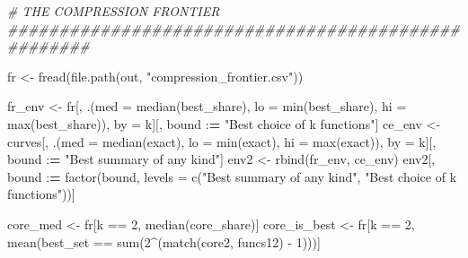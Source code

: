 \documentclass[
  11pt,
]{article}
\newenvironment{Shaded}{\begin{snugshade}}{\end{snugshade}}
\newcommand{\AttributeTok}[1]{\textcolor[rgb]{0.77,0.63,0.00}{#1}}
\newcommand{\CommentTok}[1]{\textcolor[rgb]{0.56,0.35,0.01}{\textit{#1}}}
\newcommand{\DecValTok}[1]{\textcolor[rgb]{0.00,0.00,0.81}{#1}}
\newcommand{\ErrorTok}[1]{\textcolor[rgb]{0.64,0.00,0.00}{\textbf{#1}}}
\newcommand{\FunctionTok}[1]{\textcolor[rgb]{0.00,0.00,0.00}{#1}}
\newcommand{\NormalTok}[1]{#1}
\newcommand{\OtherTok}[1]{\textcolor[rgb]{0.56,0.35,0.01}{#1}}
\newcommand{\SpecialCharTok}[1]{\textcolor[rgb]{0.00,0.00,0.00}{#1}}
\newcommand{\StringTok}[1]{\textcolor[rgb]{0.31,0.60,0.02}{#1}}
\begin{document}
\begin{Shaded}
\begin{Highlighting}[]
\CommentTok{\# THE COMPRESSION FRONTIER \#\#\#\#\#\#\#\#\#\#\#\#\#\#\#\#\#\#\#\#\#\#\#\#\#\#\#\#\#\#\#\#\#\#\#\#\#\#\#\#\#\#\#\#\#\#\#\#\#\#\#\#}

\NormalTok{fr }\OtherTok{\textless{}{-}} \FunctionTok{fread}\NormalTok{(}\FunctionTok{file.path}\NormalTok{(out, }\StringTok{"compression\_frontier.csv"}\NormalTok{))}

\NormalTok{fr\_env }\OtherTok{\textless{}{-}}\NormalTok{ fr[, .(}\AttributeTok{med =} \FunctionTok{median}\NormalTok{(best\_share), }\AttributeTok{lo =} \FunctionTok{min}\NormalTok{(best\_share),}
                 \AttributeTok{hi =} \FunctionTok{max}\NormalTok{(best\_share)), by }\OtherTok{=}\NormalTok{ k][, bound }\SpecialCharTok{:}\ErrorTok{=} \StringTok{"Best choice of k functions"}\NormalTok{]}
\NormalTok{ce\_env }\OtherTok{\textless{}{-}}\NormalTok{ curves[, .(}\AttributeTok{med =} \FunctionTok{median}\NormalTok{(exact), }\AttributeTok{lo =} \FunctionTok{min}\NormalTok{(exact), }\AttributeTok{hi =} \FunctionTok{max}\NormalTok{(exact)),}
\NormalTok{                 by }\OtherTok{=}\NormalTok{ k][, bound }\SpecialCharTok{:}\ErrorTok{=} \StringTok{"Best summary of any kind"}\NormalTok{]}
\NormalTok{env2 }\OtherTok{\textless{}{-}} \FunctionTok{rbind}\NormalTok{(fr\_env, ce\_env)}
\NormalTok{env2[, bound }\SpecialCharTok{:}\ErrorTok{=} \FunctionTok{factor}\NormalTok{(bound, }\AttributeTok{levels =} \FunctionTok{c}\NormalTok{(}\StringTok{"Best summary of any kind"}\NormalTok{,}
                                         \StringTok{"Best choice of k functions"}\NormalTok{))]}

\NormalTok{core\_med }\OtherTok{\textless{}{-}}\NormalTok{ fr[k }\SpecialCharTok{==} \DecValTok{2}\NormalTok{, }\FunctionTok{median}\NormalTok{(core\_share)]}
\NormalTok{core\_is\_best }\OtherTok{\textless{}{-}}\NormalTok{ fr[k }\SpecialCharTok{==} \DecValTok{2}\NormalTok{, }\FunctionTok{mean}\NormalTok{(best\_set }\SpecialCharTok{==} \FunctionTok{sum}\NormalTok{(}\DecValTok{2}\SpecialCharTok{\^{}}\NormalTok{(}\FunctionTok{match}\NormalTok{(core2, funcs12) }\SpecialCharTok{{-}} \DecValTok{1}\NormalTok{)))]}


\end{Highlighting}
\end{Shaded}
\end{document}
